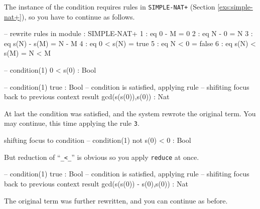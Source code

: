 \documentclass[a4paper]{memoir}
\begin{document}
The instance of the condition requires
rules in \verb|SIMPLE-NAT+| (Section \ref{exs:simple-nat+}),
so you have to continue as follows.
\begin{vvtm}
\begin{ccode}
   -- rewrite rules in module : SIMPLE-NAT+
    1 : eq 0 - M = 0
    2 : eq N - 0 = N
    3 : eq s(N) - s(M) = N - M
    4 : eq 0 < s(N) = true
    5 : eq N < 0 = false
    6 : eq s(N) < s(M) = N < M

  -- condition(1) 0 < s(0) : Bool

  -- condition(1) true : Bool
  -- condition is satisfied, applying rule
  -- shifiting focus back to previous context
  result gcd(s(s(0)),s(0)) : Nat

\end{ccode}
\end{vvtm}
At last the condition was satisfied, and the system rewrote the
original term. You may continue, this time applying the rule \verb|3|.
\begin{vvtm}
\begin{ccode}
  shifting focus to condition
  -- condition(1) not s(0) < 0 : Bool

\end{ccode}
\end{vvtm}
But reduction of ``\verb|_<_|'' is obvious so you apply \verb|reduce|
at once.
\begin{vvtm}
\begin{ccode}
  -- condition(1) true : Bool
  -- condition is satisfied, applying rule
  -- shifiting focus back to previous context
  result gcd(s(s(0)) - s(0),s(0)) : Nat

\end{ccode}
\end{vvtm}
The original term was further rewritten, and you can continue as before.
\end{document}
